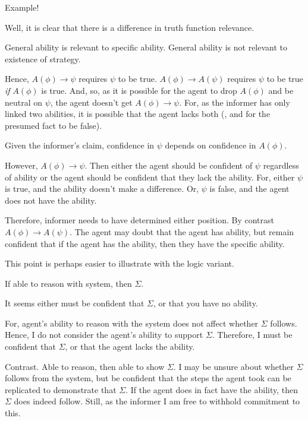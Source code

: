 \documentclass[10pt]{article}
\newcommand{\hozlinedash}[0]{%
  \noindent\hdashrule[0.5ex][c]{\textwidth}{.1pt}{2.5pt}
}
\begin{document}
\hozlinedash

Example!


Well, it is clear that there is a difference in truth function relevance.

General ability is relevant to specific ability.
General ability is not relevant to existence of strategy.

Hence, \(A(\phi) \rightarrow \psi\) requires \(\psi\) to be true.
\(A(\phi) \rightarrow A(\psi)\) requires \(\psi\) to be true \emph{if} \(A(\phi)\) is true.
And, so, as it is possible for the agent to drop \(A(\phi)\) and be neutral on \(\psi\), the agent doesn't get \(A(\phi) \rightarrow \psi\).
For, as the informer has only linked two abilities, it is possible that the agent lacks both (, and for the presumed fact to be false).

Given the informer's claim, confidence in \(\psi\) depends on confidence in \(A(\phi)\).

However, \(A(\phi) \rightarrow \psi\).
Then either the agent should be confident of \(\psi\) regardless of ability or the agent should be confident that they lack the ability.
For, either \(\psi\) is true, and the ability doesn't make a difference.
Or, \(\psi\) is false, and the agent does not have the ability.

Therefore, informer needs to have determined either position.
By contrast \(A(\phi) \rightarrow A(\psi)\).
The agent may doubt that the agent has ability, but remain confident that if the agent has the ability, then they have the specific ability.

This point is perhaps easier to illustrate with the logic variant.

If able to reason with system, then \(\Sigma\).

It seems either must be confident that \(\Sigma\), or that you have no ability.

For, agent's ability to reason with the system does not affect whether \(\Sigma\) follows.
Hence, I do not consider the agent's ability to support \(\Sigma\).
Therefore, I must be confident that \(\Sigma\), or that the agent lacks the ability.

Contrast.
Able to reason, then able to show \(\Sigma\).
I may be unsure about whether \(\Sigma\) follows from the system, but be confident that the steps the agent took can be replicated to demonstrate that \(\Sigma\).
If the agent does in fact have the ability, then \(\Sigma\) does indeed follow.
Still, as the informer I am free to withhold commitment to this.
\end{document}
